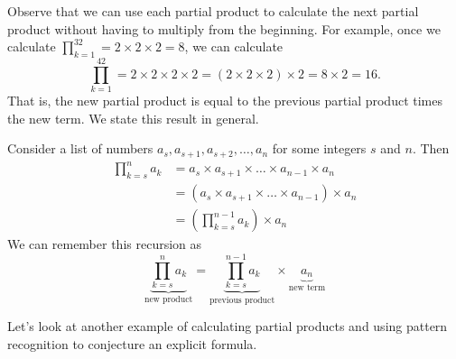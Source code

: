 Observe that we can use each partial product to calculate the next partial product without having to multiply from the beginning.  For example, once we calculate $\displaystyle \prod_{k=1}^32 = 2 \times 2 \times 2 = 8$, we can calculate 
    $$\displaystyle \prod_{k=1}^42 = 2 \times 2 \times 2 \times 2 = (2 \times 2 \times 2)\times 2=8 \times 2=16.$$  
That is, the new partial product is equal to the previous partial product times the new term.
We state this result in general.

\begin{rem}
\label{rem_rec_def_partial_prod}
    Consider a list of numbers $a_s, a_{s+1}, a_{s+2}, \ldots, a_n$ for some integers $s$ and $n$. Then
        \begin{align*}
            \prod_{k=s}^n a_k & = a_s \times a_{s+1} \times \ldots \times a_{n-1} \times a_n \\
            & = (a_s \times a_{s+1}\times \ldots \times a_{n-1}) \times a_n \\
            & = \left(\prod_{k=s}^{n-1} a_k\right) \times  a_n
        \end{align*}
    We can remember this recursion as
        $$\underbrace{\prod_{k=s}^n a_k}_{\text{new product}} 
        = \underbrace{\prod_{k=s}^{n-1} a_k}_{\text{previous product}} 
        \times \underbrace{a_n}_{\text{new term}}$$
\end{rem}

Let's look at another example of calculating partial products and using pattern recognition to conjecture an explicit formula.

